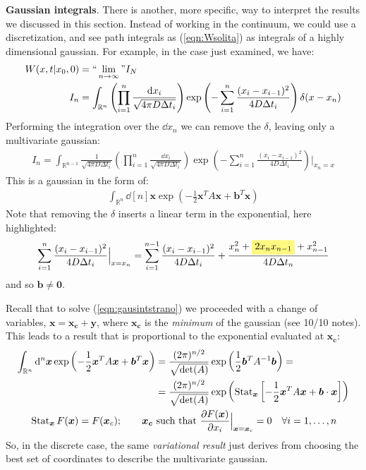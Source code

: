 \documentclass[../template.tex]{subfiles}
\begin{document}
\begin{expl}
\textbf{Gaussian integrals}. There is another, more specific, way to interpret the results we discussed in this section. Instead of working in the continuum, we could use a discretization, and see path integrals as (\ref{eqn:Wsolita}) as integrals of a highly dimensional gaussian. For example, in the case just examined, we have:
\begin{align*}
    W(x,t|x_0,0) &= ``\lim_{n \to\infty}" I_N\\
    I_n &= \int_{\mathbb{R}^n} \left(\prod_{i=1}^n \frac{\dd{x_i}}{\sqrt{4 \pi D \Delta t_i}} \right) \exp\left(-\sum_{i=1}^n \frac{(x_i - x_{i-1})^2}{4D \Delta t_i } \right) \delta (x-x_n)
\end{align*} 
Performing the integration over the $\dd{x_n}$ we can remove the $\delta$, leaving only a multivariate gaussian:
\begin{align*}
    I_n = \int_{\mathbb{R}^{n-1}} \frac{1}{\sqrt{4 \pi D \Delta t_i }} \left(\prod_{i=1}^n \frac{\dd{x_i}}{\sqrt{4 \pi D \Delta t_i}} \right) \exp\left(-\sum_{i=1}^n \frac{(x_i - x_{i-1})^2}{4 D \Delta t_i} \right) \Big|_{x_n = x}
\end{align*}
This is a gaussian in the form of:
\begin{align}
    \int_{\mathbb{R}^n} \dd[n]{\bm{x}} \exp\left(-\frac{1}{2} \bm{x}^T A \bm{x} + \bm{b}^T \bm{x} \right) \label{eqn:gausintstrano}
\end{align}
Note that removing the $\delta$ inserts a linear term in the exponential, here highlighted:
\begin{align*}
    \sum_{i=1}^{n} \frac{(x_i - x_{i-1})^2}{4 D \Delta t_i}\Big|_{x = x_n} = \sum_{i=1}^{n-1} \frac{(x_i - x_{i-1})^2}{4 D \Delta t_i} +  \frac{x_n^2 + \hlc{Yellow}{2x_n x_{n-1}} + x_{n-1}^2}{4 D \Delta t_n} 
\end{align*}
and so $\bm{b} \neq \bm{0}$.

Recall that to solve (\ref{eqn:gausintstrano}) we proceeded with a change of variables, $\bm{x} = \bm{x_c} + \bm{y}$, where $\bm{x_c}$ is the \textit{minimum} of the gaussian (see 10/10 notes). This leads to a result that is proportional to the exponential evaluated at $\bm{x_c}$:
\begin{align*}
    \int_{\mathbb{R}^n} \dd[n]{\bm{x}} \exp\left(-\frac{1}{2} \bm{x}^T A \bm{x} + \bm{b}^T \bm{x}  \right) &= \frac{(2 \pi)^{n/2}}{\sqrt{\operatorname{det}(A) }}\exp\left(\frac{1}{2} \bm{b}^T A^{-1} \bm{b} \right) =\\
    &= \frac{(2 \pi)^{n/2}}{\sqrt{\operatorname{det}(A) }} \exp\left(\operatorname{Stat}_{\bm{x}} \left[-\frac{1}{2} \bm{x}^T A \bm{x} + \bm{b} \cdot \bm{x} \right] \right) \\ \span
    \operatorname{Stat}_{\bm{x}} F(\bm{x}) = F(\bm{x}_c); \qquad \bm{x_c} \text{ such that } \pdv{F(\bm{x})}{x_i} \Big|_{\bm{x} = \bm{x}_c} = 0 \quad \forall i = 1,\dots, n
\end{align*}
So, in the discrete case, the same \textit{variational result} just derives from choosing the best set of coordinates to describe the multivariate gaussian. 

\end{expl}





 
\end{document}
